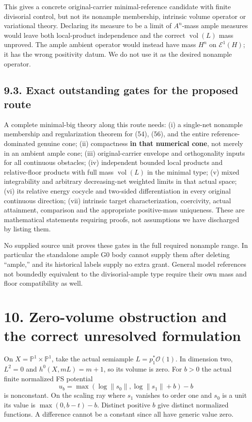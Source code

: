 \documentclass[
  10pt,
]{article}
\begin{document}
This gives a concrete original-carrier minimal-reference candidate with
finite divisorial control, but not its nonample membership, intrinsic
volume operator or variational theory. Declaring its measure to be a
limit of \(A^n\)-mass ample measures would leave both local-product
independence and the correct \(\operatorname{vol}(L)\) mass unproved.
The ample ambient operator would instead have mass \(H^n\) on
\(\mathcal E^1(H)\); it has the wrong positivity datum. We do not use it
as the desired nonample operator.

\subsection{9.3. Exact outstanding gates for the proposed
route}\label{exact-outstanding-gates-for-the-proposed-route}

A complete minimal-big theory along this route needs: (i) a single-net
nonample membership and regularization theorem for (54), (56), and the
entire reference-dominated genuine cone; (ii) compactness \textbf{in
that numerical cone}, not merely in an ambient ample cone; (iii)
original-carrier envelope and orthogonality inputs for all continuous
obstacles; (iv) independent bounded local products and relative-floor
products with full mass \(\operatorname{vol}(L)\) in the minimal type;
(v) mixed integrability and arbitrary decreasing-net weighted limits in
that actual space; (vi) its relative energy cocycle and two-sided
differentiation in every original continuous direction; (vii) intrinsic
target characterization, coercivity, actual attainment, comparison and
the appropriate positive-mass uniqueness. These are mathematical
statements requiring proofs, not assumptions we have discharged by
listing them.

No supplied source unit proves these gates in the full required nonample
range. In particular the standalone ample G0 body cannot supply them
after deleting ``ample,'' and its historical labels supply no extra
grant. General model references not boundedly equivalent to the
divisorial-ample type require their own mass and floor compatibility as
well.

\section{10. Zero-volume obstruction and the correct unresolved
formulation}\label{zero-volume-obstruction-and-the-correct-unresolved-formulation}

On \(X=\mathbb P^1\times\mathbb P^1\), take the actual semiample
\(L=p_1^*\mathcal O(1)\). In dimension two, \(L^2=0\) and
\(h^0(X,mL)=m+1\), so its volume is zero. For \(b>0\) the actual finite
normalized FS potential
\[u_b=\max(\log\|s_0\|,\log\|s_1\|+b)-b\tag{57}\] is nonconstant. On the
scaling ray where \(s_1\) vanishes to order one and \(s_0\) is a unit
its value is \(\max(0,b-t)-b\). Distinct positive \(b\) give distinct
normalized functions. A difference cannot be a constant since all have
generic value zero.
\end{document}
